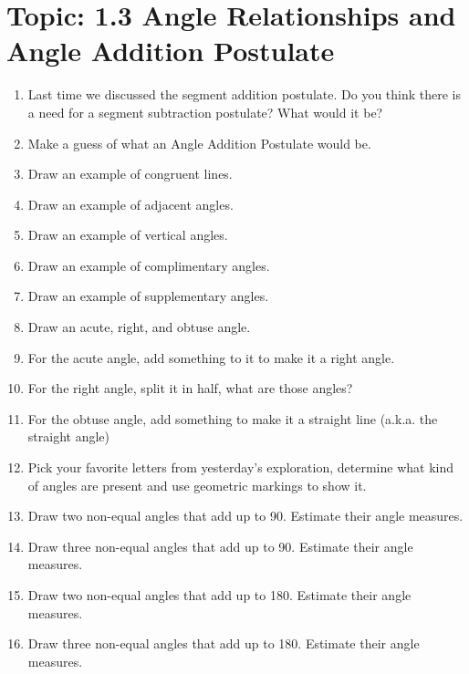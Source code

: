 \documentclass[12pt,letterpaper]{article}
\begin{document}
\section*{Topic: 1.3 Angle Relationships and Angle Addition Postulate}
\begin{enumerate}
    \item Last time we discussed the segment addition postulate. Do you think there is a need for a segment subtraction postulate? What would it be?
    \item Make a guess of what an Angle Addition Postulate would be.
    \item Draw an example of congruent lines.
    \item Draw an example of adjacent angles.
    \item Draw an example of vertical angles.
    \item Draw an example of complimentary angles.
    \item Draw an example of supplementary angles.
    \item Draw an acute, right, and obtuse angle.
    \item For the acute angle, add something to it to make it a right angle.
    \item For the right angle, split it in half, what are those angles?
    \item For the obtuse angle, add something to make it a straight line (a.k.a. the straight angle)
    \item Pick your favorite letters from yesterday's exploration, determine what kind of angles are present and use geometric markings to show it.
    \item Draw two non-equal angles that add up to 90. Estimate their angle measures.
    \item Draw three non-equal angles that add up to 90.
          Estimate their angle measures.
    \item Draw two non-equal angles that add up to 180. Estimate their angle measures.
    \item Draw three non-equal angles that add up to 180.
          Estimate their angle measures.
\end{enumerate}
\end{document}
